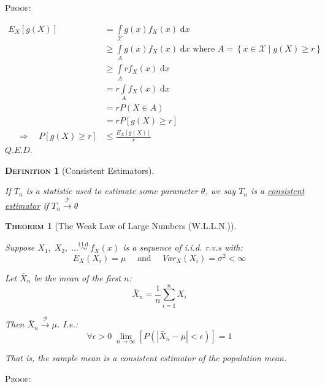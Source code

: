 \documentclass[12pt,a4paper]{article}
\newtheorem{definition}{\textsc{Definition}}[section]
\newtheorem{theorem}{\textsc{Theorem}}[section]
\newcommand{\diff}{\mathrm{d}}
\newcommand{\imply}{\quad\Rightarrow\quad}
\begin{document}
\noindent\textsc{Proof:}\par\vspace{1cm}

\begin{align*}
E_X\left[g(X)\right] &= \int\limits_{\mathcal{X}}\!\! g(x)f_X(x)\;\diff x\\
&\geq \int\limits_{A}\!\! g(x)f_X(x)\;\diff x \mbox{ where $A = \left\{x\in\mathcal{X}\mid g(X) \geq r\right\}$}\\
&\geq \int\limits_{A}\!\! rf_X(x)\;\diff x\\
&= r \int\limits_{A}\!\! f_X(x)\;\diff x\\
&= r P\left(X\in A\right)\\
&= r P\left[g(X)\geq r\right]\\
\imply P\left[g(X)\geq r\right] &\leq \frac{E_X\left[g(X)\right]}{r}
\end{align*}\hfill$Q.E.D.$\par\vspace{1cm}


\begin{definition}[Consistent Estimators]$\;$\par\vspace{1cm}

If $T_n$ is a statistic used to estimate some parameter $\theta$, we say $T_n$ is a \underline{consistent estimator} if $T_n\xrightarrow{\mathscr{P}}\theta$

\end{definition}

\begin{theorem}[The Weak Law of Large Numbers (W.L.L.N.)]$\;$\par\vspace{1cm}

Suppose $X_1,\;X_2,\;\hdots \overset{\text{i.i.d.}}{\sim} f_X(x)$ is a sequence of i.i.d. r.v.s with:
$$E_X(X_i) = \mu\quad \text{ and }\quad Var_X(X_i) = \sigma^2 < \infty$$

Let $\bar{X}_n$ be the mean of the first $n$:
$$\bar{X}_n = \frac{1}{n} \sum_{i=1}^n X_i$$

Then $\bar{X}_n\xrightarrow{\mathscr{P}}\mu$. I.e.:
$$\forall \epsilon > 0 \;\lim_{n\to\infty}\left[P\left(\left|\bar{X}_n-\mu\right|<\epsilon\right)\right] = 1$$

That is, the sample mean is a consistent estimator of the population mean.

\end{theorem}

\noindent\textsc{Proof:}\par\vspace{1cm}
\end{document}
